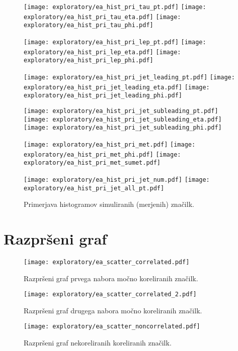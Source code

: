 \begin{figure}[ht]
	\label{hist_prim}

	\texttt{[image: exploratory/ea\_hist\_pri\_tau\_pt.pdf]}	
	\texttt{[image: exploratory/ea\_hist\_pri\_tau\_eta.pdf]}	
	\texttt{[image: exploratory/ea\_hist\_pri\_tau\_phi.pdf]}	
	
	\texttt{[image: exploratory/ea\_hist\_pri\_lep\_pt.pdf]}	
	\texttt{[image: exploratory/ea\_hist\_pri\_lep\_eta.pdf]}	
	\texttt{[image: exploratory/ea\_hist\_pri\_lep\_phi.pdf]}	
	
	\texttt{[image: exploratory/ea\_hist\_pri\_jet\_leading\_pt.pdf]}	
	\texttt{[image: exploratory/ea\_hist\_pri\_jet\_leading\_eta.pdf]}	
	\texttt{[image: exploratory/ea\_hist\_pri\_jet\_leading\_phi.pdf]}	
	
	\texttt{[image: exploratory/ea\_hist\_pri\_jet\_subleading\_pt.pdf]}	
	\texttt{[image: exploratory/ea\_hist\_pri\_jet\_subleading\_eta.pdf]}	
	\texttt{[image: exploratory/ea\_hist\_pri\_jet\_subleading\_phi.pdf]}
	
	
	\texttt{[image: exploratory/ea\_hist\_pri\_met.pdf]}	
	\texttt{[image: exploratory/ea\_hist\_pri\_met\_phi.pdf]}	
	\texttt{[image: exploratory/ea\_hist\_pri\_met\_sumet.pdf]}	
	
	\texttt{[image: exploratory/ea\_hist\_pri\_jet\_num.pdf]}	
	\texttt{[image: exploratory/ea\_hist\_pri\_jet\_all\_pt.pdf]}	

	\caption{Primerjava histogramov simuliranih (merjenih) značilk.}	
	\label{sl:histogram_izmerjene}		
	
\end{figure}

\clearpage

\section{Razpršeni graf}

\new\begin{figure}[ht]
	\texttt{[image: exploratory/ea\_scatter\_correlated.pdf]}	
	\caption{Razpršeni graf prvega nabora močno koreliranih značilk.}
	\label{sl:scatter_corr}
\end{figure}

\begin{figure}[ht]	
	\texttt{[image: exploratory/ea\_scatter\_correlated\_2.pdf]}	
	\caption{Razpršeni graf drugega nabora močno koreliranih značilk.}
	\label{sl:scatter_corr2}
\end{figure}

\begin{figure}[ht]
	\texttt{[image: exploratory/ea\_scatter\_noncorrelated.pdf]}	
	\caption{Razpršeni graf nekoreliranih koreliranih značilk.}
	\label{sl:scatter_noncorr}			
\end{figure}



